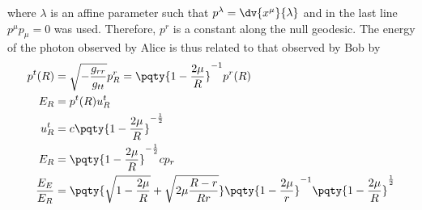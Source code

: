 \documentclass[12pt]{article}
\begin{document}
        where \(\lambda\) is an affine parameter such that \(p^\lambda = \dv{x^\mu}{\lambda}\) and in the last line \(p^\mu p_\mu = 0\) was used. Therefore, \(p^r\) is a constant along the null geodesic. The energy of the photon observed by Alice is thus related to that observed by Bob by \begin{align*}
            p^t(R) &= \sqrt{ -\frac{g_{rr}}{g_{tt}}}  p^r_R = \pqty{1 - \frac{2\mu}{R}}^{-1} p^r(R)\\
            E_R &= p^t(R) u_R^t\\
            u_R^t &= c \pqty{1 - \frac{2\mu}{R}}^{ - \frac{1}{2}}\\
            E_R &= \pqty{1 - \frac{2\mu}{R}}^{ -\frac{1}{2}} cp_r  \\
            \frac{E_E}{E_R} &= \pqty{\sqrt{1 - \frac{2\mu}{R}}  + \sqrt{2\mu \frac{R - r}{Rr} }} \pqty{1 - \frac{2\mu}{r}}^{-1} \pqty{1 - \frac{2\mu}{R}}^\frac{1}{2} 
        \end{align*}
\end{document}
